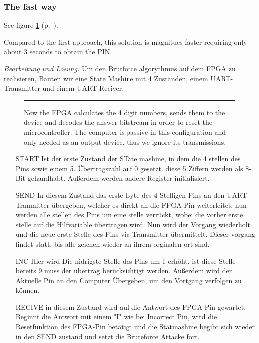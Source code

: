 \subsubsection*{The fast way}
See figure \ref{fig:as4-schematic-2} (p.~\pageref{fig:as4-schematic-2}).

Compared to the first approach, this solution is magnitues faster requiring only about 3 seconds to obtain the PIN.

\emph{Bearbeitung und Lösung: }
Um den Brutforce algorythmus auf dem FPGA zu realisieren, Bauten wir eine State Mashine mit 4 Zuständen, einem UART-Transmitter und einem UART-Reciver.



\begin{figure}[tb]
    \begin{center}
        
        \caption{Now the FPGA calculates the 4 digit numbers, sends them to the device and decodes the answer bitstream in order to reset the microcontroller. The computer is passive in this configuration and only needed as an output device, thus we ignore its transmissions.}
        \label{fig:as4-schematic-2}
        \vspace{1em}\hrule
    \end{center}
\end{figure}


\begin{itemize}


\item[START] Ist der erste Zustand der STate mashine, in dem die 4 stellen des Pins sowie einem 5. Übertragszahl auf 0 gesetzt. diese 5 Ziffern werden als 8-Bit gehandhabt. Außerdem werden andere Register initialisiert.

\item[SEND] In diesem Zustand das erste Byte des 4 Stelligen Pins an den UART-Tranmitter übergeben, welcher es direkt an die FPGA-Pin weiterleitet. nun werden alle stellen des Pins um eine stelle verrückt, wobei die vorher erste stelle auf die Hilfvariable übertragen wird. Nun wird der Vorgang wiederholt und die neue erste Stelle des Pins via Transmitter übermittelt. Dieser vorgang findet statt, bis alle zeichen wieder an ihrem orginalen ort sind. 

\item[INC] Hier wird Die nidrigste Stelle des Pins um 1 erhöht. ist diese Stelle bereits 9 muss der übertrag berücksichtigt werden. Außerdem wird der Aktuelle Pin an den Computer Übergeben, um den Vortgang verfolgen zu können.

\item[RECIVE] in diesem Zustand wird auf die Antwort des FPGA-Pin gewartet. Beginnt die Antwort mit einem "I" wie bei Incorrect Pin, wird die Resetfunktion des FPGA-Pin betätigt und die Statmashine begibt sich wieder in den SEND zustand und setzt die Bruteforce Attacke fort.

\end{itemize}


